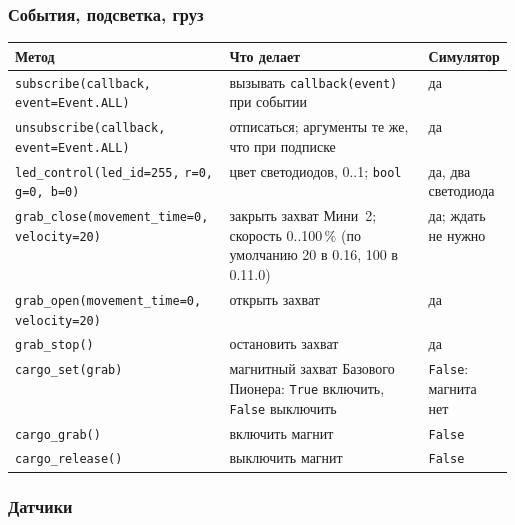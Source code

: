 \subsubsection*{События, подсветка, груз}

\begin{center}
\footnotesize
\begin{tabularx}{\linewidth}{@{}>{\raggedright\arraybackslash}p{0.43\linewidth} >{\raggedright\arraybackslash}X >{\raggedright\arraybackslash}p{0.15\linewidth}@{}}
\toprule
\textbf{Метод} & \textbf{Что делает} & \textbf{Симулятор} \\
\midrule
\verb|subscribe(callback,| \verb|event=Event.ALL)| & вызывать \verb|callback(event)| при событии & да \\
\verb|unsubscribe(callback,| \verb|event=Event.ALL)| & отписаться; аргументы те же, что при подписке & да \\
\verb|led_control(led_id=255,| \verb|r=0, g=0, b=0)| & цвет светодиодов, 0..1; \verb|bool| & да, два светодиода \\
\verb|grab_close(movement_time=0,| \verb|velocity=20)| & закрыть захват Мини~2; скорость 0..100\,\% (по умолчанию 20 в 0.16, 100 в 0.11.0) & да; ждать не нужно \\
\verb|grab_open(movement_time=0,| \verb|velocity=20)| & открыть захват & да \\
\verb|grab_stop()| & остановить захват & да \\
\verb|cargo_set(grab)| & магнитный захват Базового Пионера: \verb|True| включить, \verb|False| выключить & \verb|False|: магнита нет \\
\verb|cargo_grab()| & включить магнит & \verb|False| \\
\verb|cargo_release()| & выключить магнит & \verb|False| \\
\bottomrule
\end{tabularx}
\end{center}

\subsubsection*{Датчики}

